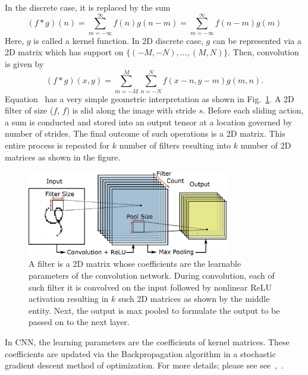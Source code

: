 In the discrete case, it is replaced by the sum
\begin{equation}
    (f*g)(n) = \sum_{m=-\infty}^{\infty} f(n)g(n-m) = \sum_{m=-\infty}^{\infty} f(n-m)g(m)
\end{equation}
Here, $g$ is called a kernel function. In 2D discrete case, $g$ can be represented via a 2D matrix which has support on $\{ (-M, -N), \hdots, (M, N)\}$. Then, convolution is given by
\begin{equation}\label{eq_conv2d}
    (f*g)(x, y) = \sum_{m=-M}^{M} \sum_{n=-N}^{N} f(x-n, y-m)g(m, n).
\end{equation}
Equation~ has a very simple geometric interpretation as shown in Fig.~\ref{fig_conv_pooling}. A 2D filter of size ($f$, $f$) is slid along the image with stride $s$. Before each sliding action, a sum is conducted and stored into an output tensor at a location governed by number of strides. The final outcome of such operations is a 2D matrix. This entire process is repeated for $k$ number of filters resulting into $k$ number of 2D matrices as shown in the figure. 
\begin{figure}
\centering
\includegraphics[width=250pt]{idetc-20/figure/fig_conv.eps}
  \caption{A filter is a 2D matrix whose coefficients are the learnable parameters of the convolution network. During convolution, each of such filter it is convolved on the input followed by nonlinear ReLU activation resulting in $k$ such 2D matrices as shown by the middle entity. Next, the output is max pooled to formulate the output to be passed on to the next layer.}
\label{fig_conv_pooling}
\end{figure}
In CNN, the learning parameters are the coefficients of kernel matrices. These coefficients are updated via the Backpropagation algorithm in a stochastic gradient descent method of optimization. For more details; please see see~\cite{bottou2010large},~\cite{rumelhart1986learning}.

